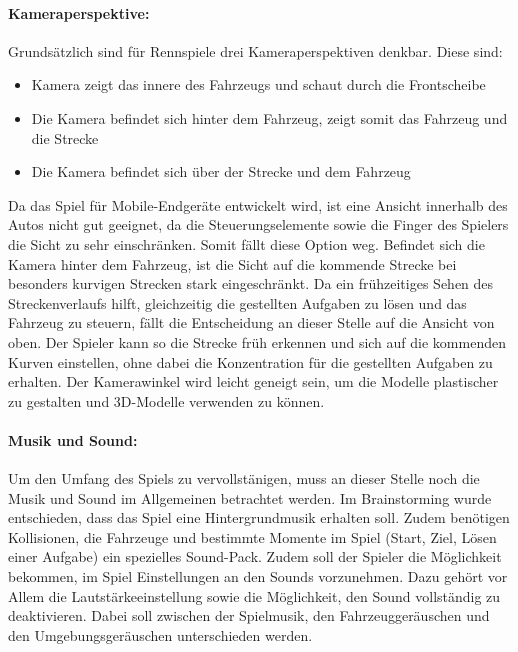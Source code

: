		\paragraph{Kameraperspektive:}
		Grundsätzlich sind für Rennspiele drei Kameraperspektiven denkbar. Diese sind:
		\begin{itemize}
			\item{Kamera zeigt das innere des Fahrzeugs und schaut durch die Frontscheibe}
			\item{Die Kamera befindet sich hinter dem Fahrzeug, zeigt somit das Fahrzeug und die Strecke}
			\item{Die Kamera befindet sich über der Strecke und dem Fahrzeug}
		\end{itemize}
		Da das Spiel für Mobile-Endgeräte entwickelt wird, ist eine Ansicht innerhalb des Autos nicht gut geeignet, da die Steuerungselemente sowie die Finger des Spielers die Sicht zu sehr einschränken. Somit fällt diese Option weg.
		Befindet sich die Kamera hinter dem Fahrzeug, ist die Sicht auf die kommende Strecke bei besonders kurvigen Strecken stark eingeschränkt. Da ein frühzeitiges Sehen des Streckenverlaufs hilft, gleichzeitig die gestellten Aufgaben zu lösen und das Fahrzeug zu steuern, fällt die Entscheidung an dieser Stelle auf die Ansicht von oben.
		Der Spieler kann so die Strecke früh erkennen und sich auf die kommenden Kurven einstellen, ohne dabei die Konzentration für die gestellten Aufgaben zu erhalten. Der Kamerawinkel wird leicht geneigt sein, um die Modelle plastischer zu gestalten und 3D-Modelle verwenden zu können.

		\paragraph{Musik und Sound:}
		Um den Umfang des Spiels zu vervollstänigen, muss an dieser Stelle noch die Musik und Sound im Allgemeinen betrachtet werden. Im Brainstorming wurde entschieden, dass das Spiel eine Hintergrundmusik erhalten soll. Zudem benötigen Kollisionen, die Fahrzeuge und bestimmte Momente im Spiel (Start, Ziel, Lösen einer Aufgabe) ein spezielles Sound-Pack.
		Zudem soll der Spieler die Möglichkeit bekommen, im Spiel Einstellungen an den Sounds vorzunehmen. Dazu gehört vor Allem die Lautstärkeeinstellung sowie die Möglichkeit, den Sound vollständig zu deaktivieren. Dabei soll zwischen der Spielmusik, den Fahrzeuggeräuschen und den Umgebungsgeräuschen unterschieden werden.

